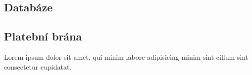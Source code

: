 \subsection{Databáze}

\subsection{Platební brána}
Lorem ipsum dolor sit amet, qui minim labore adipisicing minim sint cillum sint consectetur cupidatat.
